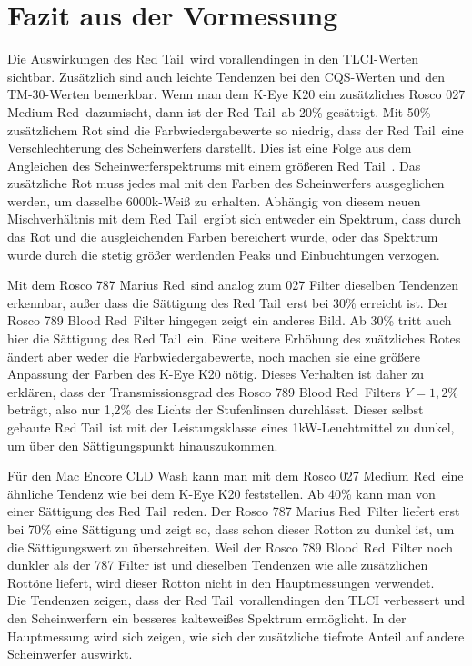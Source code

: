 \section{Fazit aus der Vormessung}
\label{sec_vmfazit}
Die Auswirkungen des \glqq Red Tail\grqq\ wird vorallendingen in den TLCI-Werten sichtbar. Zusätzlich sind auch leichte Tendenzen bei den CQS-Werten und den TM-30-Werten bemerkbar.
Wenn man dem K-Eye K20 ein zusätzliches Rosco 027 \glqq Medium Red\grqq\ dazumischt, dann ist der \glqq Red Tail\grqq\ ab 20\% gesättigt. Mit 50\% zusätzlichem Rot sind die Farbwiedergabewerte so niedrig, dass der \glqq Red Tail\grqq\ eine Verschlechterung des Scheinwerfers darstellt. Dies ist eine Folge aus dem Angleichen des Scheinwerferspektrums mit einem größeren \glqq Red Tail\grqq\ .
Das zusätzliche Rot muss jedes mal mit den Farben des Scheinwerfers ausgeglichen werden, um dasselbe 6000k-Weiß zu erhalten. Abhängig von diesem neuen Mischverhältnis mit dem \glqq Red Tail\grqq\ ergibt sich entweder ein Spektrum, dass durch das Rot und die ausgleichenden Farben bereichert wurde, oder das Spektrum wurde durch die stetig größer werdenden Peaks und Einbuchtungen verzogen.


Mit dem Rosco 787 \glqq Marius Red\grqq\ sind analog zum 027 Filter dieselben Tendenzen erkennbar, außer dass die Sättigung des \glqq Red Tail\grqq\ erst bei 30\% erreicht ist.
Der Rosco 789 \glqq Blood Red\grqq\ Filter hingegen zeigt ein anderes Bild. Ab 30\% tritt auch hier die Sättigung des \glqq Red Tail\grqq\ ein. Eine weitere Erhöhung des zuätzliches Rotes ändert aber weder die Farbwiedergabewerte, noch machen sie eine größere Anpassung der Farben des K-Eye K20 nötig. Dieses Verhalten ist daher zu erklären, dass der Transmissionsgrad des Rosco 789 \glqq Blood Red\grqq\ Filters  $Y=1,2\%$ beträgt, also nur 1,2\% des Lichts der Stufenlinsen durchlässt. Dieser selbst gebaute \glqq Red Tail\grqq\ ist mit der Leistungsklasse eines 1kW-Leuchtmittel zu dunkel, um über den Sättigungspunkt hinauszukommen.  


Für den Mac Encore CLD Wash kann man mit dem Rosco 027 \glqq Medium Red\grqq\ eine ähnliche Tendenz wie bei dem K-Eye K20 feststellen. Ab 40\% kann man von einer Sättigung des \glqq Red Tail\grqq\ reden. Der Rosco 787 \glqq Marius Red\grqq\ Filter liefert erst bei 70\% eine Sättigung und zeigt so, dass schon dieser Rotton zu dunkel ist, um die Sättigungswert zu überschreiten. Weil der Rosco 789 \glqq Blood Red\grqq\ Filter noch dunkler als der 787 Filter ist und dieselben Tendenzen wie alle zusätzlichen Rottöne liefert, wird dieser Rotton nicht in den Hauptmessungen verwendet. \\
Die Tendenzen zeigen, dass der \glqq Red Tail\grqq\ vorallendingen den TLCI verbessert und den Scheinwerfern ein besseres kalteweißes Spektrum ermöglicht. In der Hauptmessung wird sich zeigen, wie sich der zusätzliche tiefrote Anteil auf andere Scheinwerfer auswirkt.

